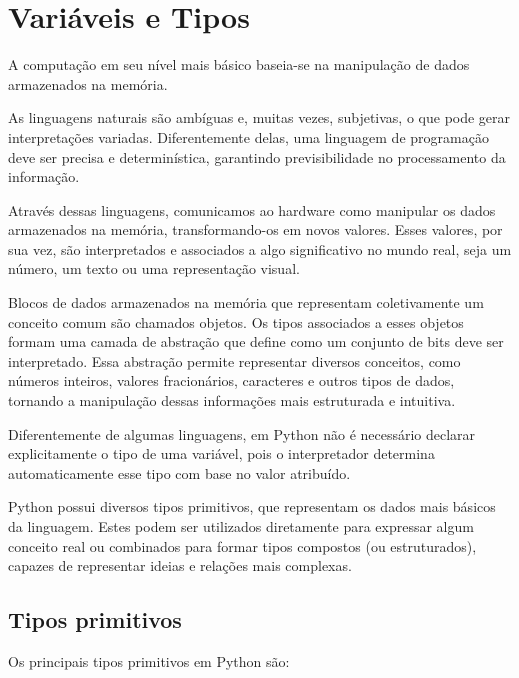 \chapter{Variáveis e Tipos}\label{vars}

A computação em seu nível mais básico baseia-se na manipulação de dados armazenados na memória.

As linguagens naturais são ambíguas e, muitas vezes, subjetivas, o que pode gerar interpretações variadas.
Diferentemente delas, uma linguagem de programação deve ser precisa e determinística, garantindo previsibilidade no
processamento da informação.

Através dessas linguagens, comunicamos ao hardware como manipular os dados armazenados na memória, transformando-os
em novos valores.
Esses valores, por sua vez, são interpretados e associados a algo significativo no mundo real, seja um número, um
texto ou uma representação visual.

Blocos de dados armazenados na memória que representam coletivamente um conceito comum são chamados objetos.
Os tipos associados a esses objetos formam uma camada de abstração que define como um conjunto de bits deve ser
interpretado.
Essa abstração permite representar diversos conceitos, como números inteiros, valores fracionários, caracteres e outros
tipos de dados, tornando a manipulação dessas informações mais estruturada e intuitiva.

Diferentemente de algumas linguagens, em Python não é necessário declarar explicitamente o tipo de uma variável, pois o interpretador determina automaticamente esse tipo com base no valor atribuído.


Python possui diversos tipos primitivos, que representam os dados mais básicos da linguagem.
Estes podem ser utilizados diretamente para expressar algum conceito real ou combinados para formar tipos compostos
(ou estruturados), capazes de representar ideias e relações mais complexas.


\section{Tipos primitivos}

Os principais tipos primitivos em Python são:

